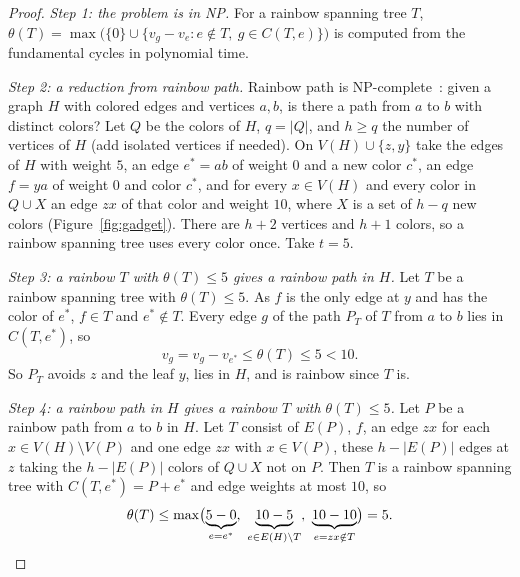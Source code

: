 \documentclass[11pt]{article}
\begin{document}
\begin{proof}
\emph{Step 1: the problem is in NP.}  For a rainbow spanning tree $T$,
$\theta(T)=\max\bigl(\{0\}\cup\{v_g-v_e:e\notin T,\ g\in C(T,e)\}\bigr)$ is
computed from the fundamental cycles in polynomial time.

\emph{Step 2: a reduction from rainbow path.}  Rainbow path is NP-complete~\cite{cfmy09}: given a graph $H$ with colored edges and vertices $a,b$, is there a
path from $a$ to $b$ with distinct colors?  Let $Q$ be the colors of $H$,
$q=|Q|$, and $h\ge q$ the number of vertices of $H$ (add isolated vertices if
needed).  On $V(H)\cup\{z,y\}$ take the edges of $H$ with weight $5$, an edge
$e^{*}=ab$ of weight $0$ and a new color $c^{*}$, an edge $f=ya$ of weight $0$ and
color $c^{*}$, and for every $x\in V(H)$ and every color in $Q\cup X$ an edge $zx$
of that color and weight $10$, where $X$ is a set of $h-q$ new colors
(Figure~\ref{fig:gadget}).  There are $h+2$ vertices and $h+1$ colors, so a
rainbow spanning tree uses every color once.  Take $t=5$.

\emph{Step 3: a rainbow $T$ with $\theta(T)\le5$ gives a rainbow path in $H$.}  Let $T$ be a rainbow spanning tree with
$\theta(T)\le5$.  As $f$ is the only edge at $y$ and has the color of $e^{*}$,
$f\in T$ and $e^{*}\notin T$.  Every edge $g$ of the path $P_T$ of $T$ from $a$
to $b$ lies in $C(T,e^{*})$, so
\[
  v_g=v_g-v_{e^{*}}\le\theta(T)\le5<10.
\]
So $P_T$ avoids $z$ and the leaf $y$, lies in $H$, and is rainbow since $T$ is.

\emph{Step 4: a rainbow path in $H$ gives a rainbow $T$ with $\theta(T)\le5$.}  Let $P$ be a rainbow path from $a$ to $b$
in $H$.  Let $T$ consist of $E(P)$, $f$, an edge $zx$ for each
$x\in V(H)\setminus V(P)$ and one edge $zx$ with $x\in V(P)$, these
$h-|E(P)|$ edges at $z$ taking the $h-|E(P)|$ colors of $Q\cup X$ not on $P$.
Then $T$ is a rainbow spanning tree with $C(T,e^{*})=P+e^{*}$ and edge weights at
most $10$, so
\[
  \theta(T)\le\max\bigl(\underbrace{5-0}_{e=e^{*}},\ \underbrace{10-5}_{e\in E(H)\setminus T},\
  \underbrace{10-10}_{e=zx\notin T}\bigr)=5.\qedhere
\]
\end{proof}
\end{document}
